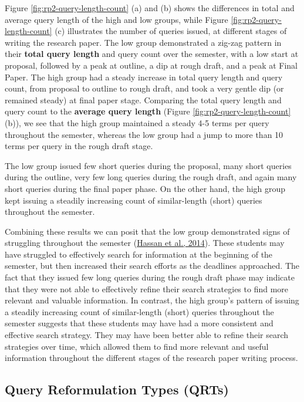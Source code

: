 \documentclass[letterpaper, nobind]{templates/ociamthesis}
\begin{document}
Figure \ref{fig:rp2-query-length-count} (a) and (b) shows the differences in total and average query length of the high and low groups, while Figure \ref{fig:rp2-query-length-count} (c) illustrates the number of queries issued, at different stages of writing the research paper. The low group demonstrated a zig-zag pattern in their \textbf{total query length} and query count over the semester, with a low start at proposal, followed by a peak at outline, a dip at rough draft, and a peak at Final Paper.
The high group had a steady increase in total query length and query count, from proposal to outline to rough draft, and took a very gentle dip (or remained steady) at final paper stage.
Comparing the total query length and query count to the \textbf{average query length} (Figure \ref{fig:rp2-query-length-count} (b)), we see that the high group maintained a steady 4-5 terms per query throughout the semester, whereas the low group had a jump to more than 10 terms per query in the rough draft stage.

The low group issued few short queries during the proposal, many short queries during the outline, very few long queries during the rough draft, and again many short queries during the final paper phase.
On the other hand, the high group kept issuing a steadily increasing count of similar-length (short) queries throughout the semester.

Combining these results we can posit that the low group demonstrated signs of struggling throughout the semester (\protect\hyperlink{ref-hassan2014struggling}{Hassan et al., 2014}).
These students may have struggled to effectively search for information at the beginning of the semester, but then increased their search efforts as the deadlines approached. The fact that they issued few long queries during the rough draft phase may indicate that they were not able to effectively refine their search strategies to find more relevant and valuable information.
In contrast, the high group's pattern of issuing a steadily increasing count of similar-length (short) queries throughout the semester suggests that these students may have had a more consistent and effective search strategy. They may have been better able to refine their search strategies over time, which allowed them to find more relevant and useful information throughout the different stages of the research paper writing process.

\hypertarget{query-reformulation-types-qrts}{%
\subsection{Query Reformulation Types (QRTs)}\label{query-reformulation-types-qrts}}
\end{document}
